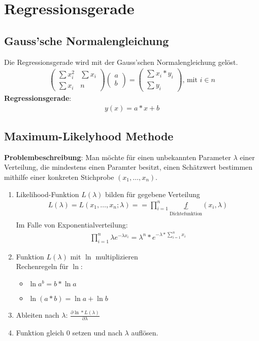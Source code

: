 \documentclass{article}
\begin{document}
	\section{Regressionsgerade}
	\subsection{Gauss'sche Normalengleichung}
	Die Regressionsgerade wird mit der Gauss'schen Normalengleichung gelöst.
	\begin{align}
	\begin{pmatrix}
	\sum x_i^2 & \sum x_i \\
	\sum x_i   & n
	\end{pmatrix}
	\begin{pmatrix}
	a \\
	b
	\end{pmatrix}
	=
	\begin{pmatrix}
	\sum x_i*y_i \\
	\sum y_i
	\end{pmatrix} \text{, mit $i \in n$}
	\end{align}
	\textbf{Regressionsgerade}:
	\begin{align}
	y(x) = a*x + b
	\end{align}
	
	\subsection{Maximum-Likelyhood Methode}
	\textbf{Problembeschreibung}: Man möchte für einen unbekannten Parameter $\lambda$
	einer Verteilung, die mindestens einen Paramter besitzt, einen Schätzwert bestimmen
	mithilfe einer konkreten Stichprobe $(x_1, \ldots, x_n)$.
	
	\begin{enumerate}
		\item Likelihood-Funktion $L(\lambda)$ bilden für gegebene Verteilung
		\begin{align}
		L(\lambda) = L(x_1, \ldots, x_n; \lambda) = = \prod_{i=1}^n
		\underbrace{f}_{\text{Dichtefunktion}}(x_i, \lambda)\\
		\end{align}
		Im Falle von Exponentialverteilung:\\
		\begin{align}
		\prod_{i=1}^n \lambda e^{-\lambda x_i} = \lambda^n * e^{-\lambda * \sum_{i=1}^{n}x_i}
		\end{align}
		\item Funktion $L(\lambda)$ mit $\ln$ multiplizieren\\
		Rechenregeln für $\ln$:
		\begin{itemize}
			\item $\ln a^b = b * \ln a$
			\item $\ln (a*b) = \ln a + \ln b$
		\end{itemize}
		\item Ableiten nach $\lambda$: $\frac{\partial \ln * L(\lambda)}{\partial \lambda}$
		\item Funktion gleich $0$ setzen und nach $\lambda$ auflösen.
	\end{enumerate}
	
\end{document}
